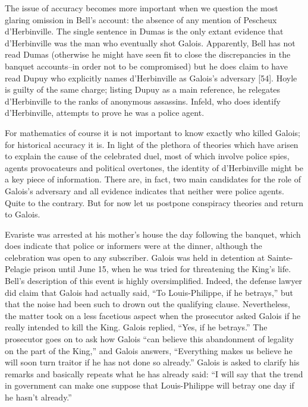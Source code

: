 \documentclass[12pt]{article}
\begin{document}
The issue of accuracy becomes more important when we question the most glaring omission in Bell's account: the absence of any mention of Pescheux d'Herbinville. The single sentence in Dumas is the only extant evidence that d'Herbinville was the man who eventually shot Galois. Apparently, Bell has not read Dumas (otherwise he might have seen fit to close the discrepancies in the banquet accounts--in order not to be compromised) but he does claim to have read Dupuy who explicitly names d'Herbinville as Galois's adversary [54]. Hoyle is guilty of the same charge; listing Dupuy as a main reference, he relegates d'Herbinville to the ranks of anonymous assassins. Infeld, who does identify d'Herbinville, attempts to prove he was a police agent.

For mathematics of course it is not important to know exactly who killed Galois; for historical accuracy it is. In light of the plethora of theories which have arisen to explain the cause of the celebrated duel, most of which involve police spies, agents provocateurs and political overtones, the identity of d'Herbinville might be a key piece of information. There are, in fact, two main candidates for the role of Galois's adversary and all evidence indicates that neither were police agents. Quite to the contrary. But for now let us postpone conspiracy theories and return to Galois.

Evariste was arrested at his mother's house the day following the banquet, which does indicate that police or informers were at the dinner, although the celebration was open to any subscriber. Galois was held in detention at Sainte-Pelagie prison until June 15, when he was tried for threatening the King's life. Bell's description of this event is highly oversimplified. Indeed, the defense lawyer did claim that Galois had actually said, ``To Louis-Philippe, if he betrays,'' but that the noise had been such to drown out the qualifying clause. Nevertheless, the matter took on a less facetious aspect when the prosecutor asked Galois if he really intended to kill the King. Galois replied, ``Yes, if he betrays.'' The prosecutor goes on to ask how Galois ``can believe this abandonment of legality on the part of the King,'' and Galois answers, ``Everything makes us believe he will soon turn traitor if he has not done so already.'' Galois is asked to clarify his remarks and basically repeats what he has already said: ``I will say that the trend in government can make one suppose that Louis-Philippe will betray one day if he hasn't already.''
\end{document}
